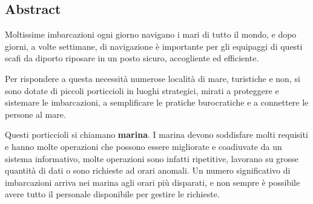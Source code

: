 \subsection{Abstract}

Moltissime imbarcazioni ogni giorno navigano i mari di tutto il mondo, e dopo giorni, a volte settimane, di navigazione è importante per gli equipaggi di questi scafi da diporto riposare in un posto sicuro, accogliente ed efficiente.

Per rispondere a questa necessità numerose località di mare, turistiche e non, si sono dotate di piccoli porticcioli in luoghi strategici, mirati a proteggere e sistemare le imbarcazioni, a semplificare le pratiche burocratiche e a connettere le persone al mare.

Questi porticcioli si chiamano \textbf{marina}. I marina devono soddisfare molti requisiti e hanno molte operazioni che possono essere migliorate e coadiuvate da un sistema informativo, molte operazioni sono infatti ripetitive, lavorano su grosse quantità di dati o sono richieste ad orari anomali. Un numero significativo di imbarcazioni arriva nei marina agli orari più disparati, e non sempre è possibile avere tutto il personale disponibile per gestire le richieste.
